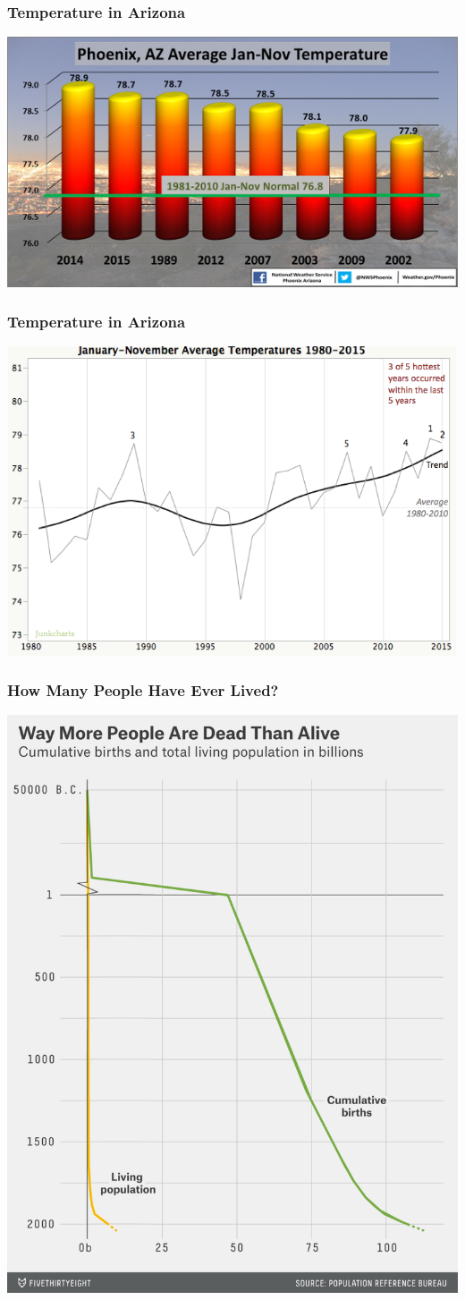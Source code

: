 \documentclass{beamer} %
\begin{document}
\begin{frame}\frametitle{Temperature in Arizona}
	\centering
	\includegraphics[width=0.9\linewidth]{temp.png}
\end{frame}


\begin{frame}\frametitle{Temperature in Arizona}
	\centering
	\includegraphics[width=0.9\linewidth]{temp2.png}
\end{frame}


\begin{frame}\frametitle{How Many People Have Ever Lived?}
	\centering
	\includegraphics[width=0.62\linewidth]{538-people.png}
\end{frame}
\end{document}
